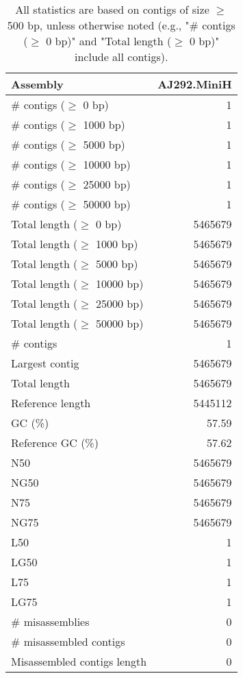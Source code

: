 \documentclass[12pt,a4paper]{article}
\begin{document}
\begin{table}[ht]
\begin{center}
\caption{All statistics are based on contigs of size $\geq$ 500 bp, unless otherwise noted (e.g., "\# contigs ($\geq$ 0 bp)" and "Total length ($\geq$ 0 bp)" include all contigs).}
\begin{tabular}{|l*{1}{|r}|}
\hline
Assembly & AJ292.MiniH \\ \hline
\# contigs ($\geq$ 0 bp) & 1 \\ \hline
\# contigs ($\geq$ 1000 bp) & 1 \\ \hline
\# contigs ($\geq$ 5000 bp) & 1 \\ \hline
\# contigs ($\geq$ 10000 bp) & 1 \\ \hline
\# contigs ($\geq$ 25000 bp) & 1 \\ \hline
\# contigs ($\geq$ 50000 bp) & 1 \\ \hline
Total length ($\geq$ 0 bp) & 5465679 \\ \hline
Total length ($\geq$ 1000 bp) & 5465679 \\ \hline
Total length ($\geq$ 5000 bp) & 5465679 \\ \hline
Total length ($\geq$ 10000 bp) & 5465679 \\ \hline
Total length ($\geq$ 25000 bp) & 5465679 \\ \hline
Total length ($\geq$ 50000 bp) & 5465679 \\ \hline
\# contigs & 1 \\ \hline
Largest contig & 5465679 \\ \hline
Total length & 5465679 \\ \hline
Reference length & 5445112 \\ \hline
GC (\%) & 57.59 \\ \hline
Reference GC (\%) & 57.62 \\ \hline
N50 & 5465679 \\ \hline
NG50 & 5465679 \\ \hline
N75 & 5465679 \\ \hline
NG75 & 5465679 \\ \hline
L50 & 1 \\ \hline
LG50 & 1 \\ \hline
L75 & 1 \\ \hline
LG75 & 1 \\ \hline
\# misassemblies & 0 \\ \hline
\# misassembled contigs & 0 \\ \hline
Misassembled contigs length & 0 \\ \hline

\end{tabular}
\end{center}
\end{table}
\end{document}
